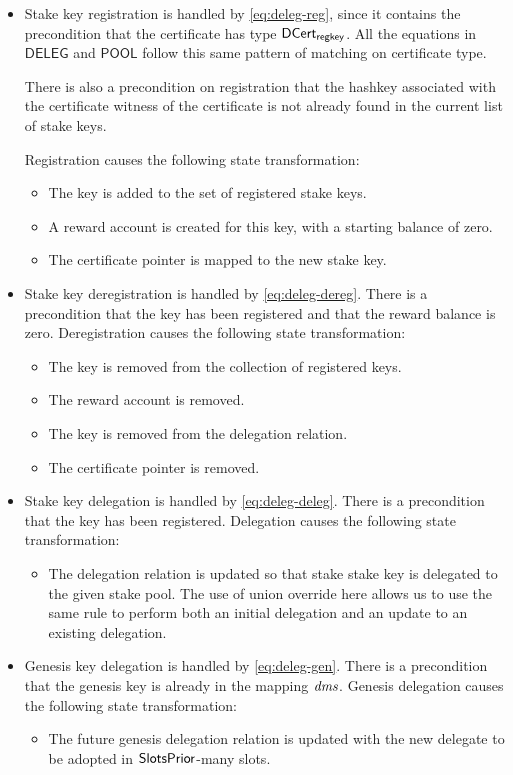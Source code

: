 \begin{itemize}
  \item Stake key registration is handled by \cref{eq:deleg-reg}, since it contains the
    precondition that the certificate has type $\mathsf{DCert_{regkey}}$.
    All the equations in $\mathsf{DELEG}$ and $\mathsf{POOL}$ follow this same pattern of matching
    on certificate type.

    There is also a precondition on registration that the hashkey associated with the certificate
    witness of the certificate is not already found in the current list of stake keys.

    Registration causes the following state transformation:
    \begin{itemize}
      \item The key is added to the set of registered stake keys.
      \item A reward account is created for this key, with a starting balance of zero.
      \item The certificate pointer is mapped to the new stake key.
    \end{itemize}

  \item Stake key deregistration is handled by \cref{eq:deleg-dereg}.
    There is a precondition that the key has been registered and that the reward balance is zero.
    Deregistration causes the following state transformation:
    \begin{itemize}
      \item The key is removed from the collection of registered keys.
      \item The reward account is removed.
      \item The key is removed from the delegation relation.
      \item The certificate pointer is removed.
    \end{itemize}

  \item Stake key delegation is handled by \cref{eq:deleg-deleg}.
    There is a precondition that the key has been registered.
    Delegation causes the following state transformation:
    \begin{itemize}
      \item The delegation relation is updated so that stake stake key is delegated to the given
        stake pool. The use of union override here allows us to use the same rule
        to perform both an initial delegation and an update to an existing delegation.
    \end{itemize}

  \item Genesis key delegation is handled by \cref{eq:deleg-gen}.
    There is a precondition that the genesis key is already in the mapping $\mathit{dms}$.
    Genesis delegation causes the following state transformation:
    \begin{itemize}
      \item The future genesis delegation relation is updated with the new delegate
        to be adopted in $\mathsf{SlotsPrior}$-many slots.
    \end{itemize}
\end{itemize}



